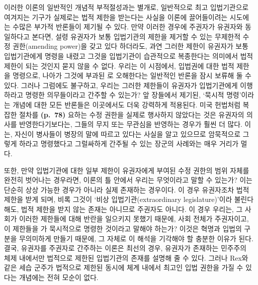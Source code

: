 이러한 이론의 일반적인 개념적 부적절성과는 별개로, 일반적으로 최고
입법기관으로 여겨지는 기구가 실제로는 법적 제한을 받는다는 사실을 이론에
끌어들이려는 시도에는 수많은 부가적 반론들이 제기될 수 있다. 만약 이러한
경우에 주권자가 유권자와 동일하다고 본다면, 설령 유권자가 보통
입법기관의 제한을 제거할 수 있는 무제한적 수정 권한(amending power)을
갖고 있다 하더라도, 과연 그러한 제한이 유권자가 보통 입법기관에게 명령을
내렸고 그것을 입법기관이 습관적으로 복종한다는 의미에서 법적 제한이 되는
것인지 묻지 않을 수 없다. 우리는 이 시점에서, 입법권에 대한 법적 제한을
명령으로, 나아가 그것에 부과된 로 오해한다는 일반적인
반론을 잠시 보류해 둘 수 있다. 그러나 그럼에도 불구하고, 우리는 그러한
제한들이 유권자가  입법기관에게 이행하라고
명령한 의무들이라고 간주할 수 있는가? 앞 장들에서 제기된, `묵시적
명령'이라는 개념에 대한 모든 반론들은 이곳에서도 더욱 강력하게 적용된다.
미국 헌법처럼 복잡한 절차를 \textbf{(p.~78)} 요하는 수정 권한을 실제로
행사하지 않았다는 것은 유권자의 의사를 반영한다기보다는, 그들의 무지
또는 무관심을 반영하는 경우가 훨씬 더 많다. 이는, 자신이 병사들이 병장의
말에 따르고 있다는 사실을 알고 있으므로 암묵적으로 그렇게 하라고
명령했다고 그럴싸하게 간주될 수 있는 장군의 사례와는 매우 거리가 멀다.

또한, 만약 입법기관에 대한 일부 제한이 유권자에게 부여된 수정 권한의
범위 자체를 완전히 벗어나는 경우라면, 이론의 틀 안에서 우리는 무엇이라고
말할 수 있는가? 이는 단순히 상상 가능한 경우가 아니라 실제 존재하는
경우이다. 이 경우 유권자조차 법적 제한을 받게 되며, 비록 그것이 `비상
입법기관(extraordinary legislature)'이라 불린다 해도, 법적 제한을 받지
않는 존재는 아니므로 주권자도 아니다. 이 경우 우리는, 그 사회가 이러한
제한들에 대해 반란을 일으키지 못했기 때문에, 사회 전체가 주권자이고, 이
제한들을 가 묵시적으로 명령한 것이라고 말해야
하는가? 이것은 혁명과 입법의 구분을 무의미하게 만들기 때문에, 그 자체로
이 해석을 기각해야 할 충분한 이유가 된다. 결국, 유권자를 주권자로
간주하는 이론은 최선의 경우, 유권자가 존재하는 민주주의 체제 내에서만
법적으로 제한된 입법기관의 존재를 설명해 줄 수 있다. 그러나 Rex와 같은
세습 군주가 법적으로 제한된 동시에 체계 내에서 최고인 입법 권한을 가질
수 있다는 개념에는 전혀 모순이 없다.

\newpage

